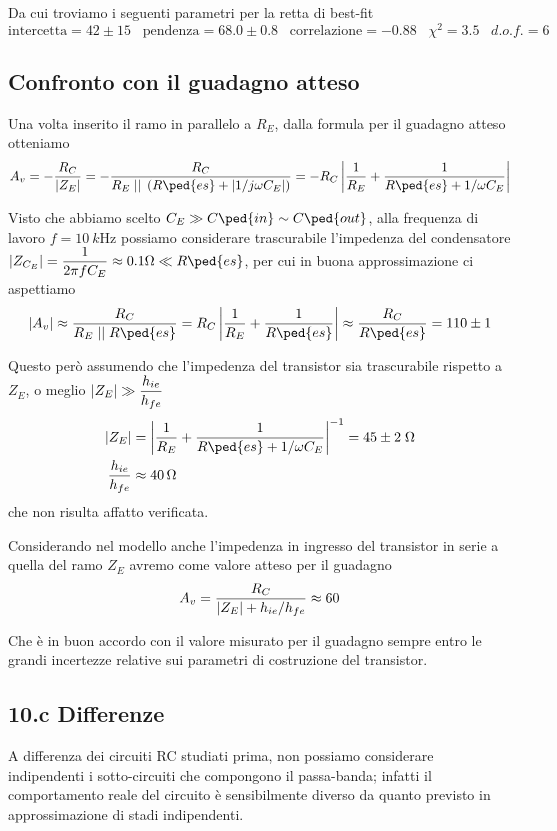 \documentclass[10pt,a4paper]{article}
\begin{document}
Da cui troviamo i seguenti parametri per la retta di best-fit
\[
\mathrm{intercetta} = 42 \pm 15 \;\;\;\mathrm{pendenza} = 68.0 \pm 0.8 \;\;\;\mathrm{correlazione} 
= -0.88 \;\;\; \chi^2 = 3.5 \;\;\; d.o.f. = 6
\]

\subsection{Confronto con il guadagno atteso}
Una volta inserito il ramo in parallelo a $R_E$, dalla formula per il guadagno
atteso otteniamo
\[
A_v = -\frac{R_C}{\abs{Z_E}} =
- \frac{R_C}{R_E \; \lvert \rvert \; \left(R\ped{es} + \abs{1/j\omega C_E}
\right)} =
- R_C \abs{\frac{1}{R_E} + \frac{1}{R\ped{es} + 1/\omega C_E}}
\]

Visto che abbiamo scelto $C_E \gg C\ped{in} \sim C\ped{out}$, alla frequenza
di lavoro $f = \SI{10}{k\Hz}$ possiamo considerare trascurabile l'impedenza
del condensatore $\abs{Z_{C_E}} = \dfrac{1}{2\pi f C_E} \approx 0.1 \si{\ohm}
\ll R\ped{es}$, per cui in buona approssimazione ci aspettiamo
\[
\abs{A_v} \approx
\frac{R_C}{R_E \; \lvert \rvert \; R\ped{es}} =
R_C \abs{\frac{1}{R_E} + \frac{1}{R\ped{es}}} \approx
\frac{R_C}{R\ped{es}} = 110 \pm 1
\]

Questo però assumendo che l'impedenza del transistor sia trascurabile rispetto
a $Z_E$, o meglio $\left| Z_E \right| \gg \dfrac{h_{ie}}{h_{fe}}$
\begin{align*}
\abs{Z_E} &= \abs{\frac{1}{R_E} + \frac{1}{R\ped{es} + 1/\omega C_E}}^{-1} =
45 \pm 2 \; \si{\ohm} \\
\frac{h_{ie}}{h_{fe}} &\approx \SI{40}{\ohm}
\end{align*}
che non risulta affatto verificata.

Considerando nel modello anche l'impedenza in ingresso del transistor in
serie a quella del ramo $Z_E$ avremo come valore atteso per il guadagno
\begin{equation}
A_v = \frac{R_C}{\left| Z_E \right| + h_{ie}/h_{fe}} \approx 60
\end{equation}

Che è in buon accordo con il valore misurato per il guadagno sempre
entro le grandi incertezze relative sui parametri di costruzione del
transistor.

\iffalse
\subsection*{10.c Differenze}
A differenza dei circuiti RC studiati prima, non possiamo considerare
indipendenti i sotto-circuiti che compongono il passa-banda; infatti il
comportamento reale del circuito è sensibilmente diverso da quanto previsto in 
approssimazione di stadi indipendenti.
\end{document}
